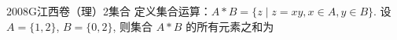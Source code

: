 
\begin{problem}{2008}{G}{江西卷（理）}{2}{集合}
定义集合运算：$ A * B = \{ z \mid z = xy, x \in A, y \in B \} $. 设 $ A = \{1, 2\} $, $ B = \{0, 2\} $, 则集合 $ A * B $ 的所有元素之和为
\begin{choices}
\end{choices}
\end{problem}

\begin{answer}

\end{answer}

\begin{solutions}

\end{solutions}
